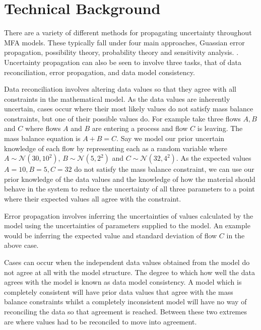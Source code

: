 \documentclass[ %
                    author={Tom Jager},
                supervisor={Dr. Daniel Schien},
                    degree={MEng},
                     title={A Bayesian Inference Engine for UMIS Structured Data},
                  subtitle={},
                      type={research},
                      year={2019} ]{dissertation}
\begin{document}

\chapter{Technical Background}
\label{chap:technical}
There are a variety of different methods for propagating uncertainty throughout MFA models. These typically fall under four main approaches, Guassian error propagation, possibility theory, probability theory and sensitivity analysis. \cite{laner2014systematic}. Uncertainty propagation can also be seen to involve three tasks, that of data reconciliation, error propagation, and data model consistency.

Data reconciliation involves altering data values so that they agree with all constraints in the mathematical model. As the data values are inherently uncertain, cases occur where their most likely values do not satisfy mass balance constraints, but one of their possible values do. For example take three flows $A, B$ and $C$ where flows $A$ and $B$ are entering a process and flow $C$ is leaving. The mass balance equation is $A + B = C$. Say we model our prior uncertain knowledge of each flow by representing each as a random variable where $A \sim \mathcal{N}(30, 10^2)$, $B \sim \mathcal{N}(5, 2^2)$ and $C \sim \mathcal{N}(32, 4^2)$. As the expected values $A = 10, B = 5, C = 32$ do not satisfy the mass balance constraint, we can use our prior knowledge of the data values and the knowledge of how the material should behave in the system to reduce the uncertainty of all three parameters to a point where their expected values all agree with the constraint.

Error propagation involves inferring the uncertainties of values calculated by the model using the uncertainties of parameters supplied to the model. An example would be inferring the expected value and standard deviation of flow $C$ in the above case.

Cases can occur when the independent data values obtained from the model do not agree at all with the model structure. The degree to which how well the data agrees with the model is known as data model consistency. A model which is completely consistent will have prior data values that agree with the mass balance constraints whilst a completely inconsistent model will have no way of reconciling the data so that agreement is reached. Between these two extremes are where values had to be reconciled to move into agreement.
\end{document}
